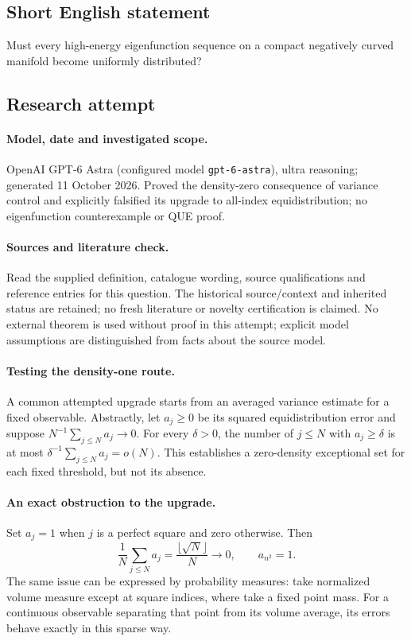 \documentclass[11pt]{article}
\begin{document}
\subsection{Short English statement}
Must every high-energy eigenfunction sequence on a compact negatively curved manifold become uniformly distributed?
\subsection{Research attempt}
\paragraph{Model, date and investigated scope.}
OpenAI GPT-6 Astra (configured model \texttt{gpt-6-astra}), ultra reasoning; generated 11 October 2026. Proved the density-zero consequence of variance control and explicitly falsified its upgrade to all-index equidistribution; no eigenfunction counterexample or QUE proof.

\paragraph{Sources and literature check.}
Read the supplied definition, catalogue wording, source qualifications and reference entries for this question. The historical source/context and inherited status are retained; no fresh literature or novelty certification is claimed. No external theorem is used without proof in this attempt; explicit model assumptions are distinguished from facts about the source model.

\paragraph{Testing the density-one route.} A common attempted upgrade starts from an averaged variance estimate for a fixed observable. Abstractly, let \(a_j\ge0\) be its squared equidistribution error and suppose \(N^{-1}\sum_{j\le N}a_j\to0\). For every \(\delta>0\), the number of \(j\le N\) with \(a_j\ge\delta\) is at most \(\delta^{-1}\sum_{j\le N}a_j=o(N)\). This establishes a zero-density exceptional set for each fixed threshold, but not its absence.
\paragraph{An exact obstruction to the upgrade.} Set \(a_j=1\) when \(j\) is a perfect square and zero otherwise. Then
\[
 \frac1N\sum_{j\le N}a_j=\frac{\lfloor\sqrt N\rfloor}{N}\longrightarrow0,
 \qquad a_{n^2}=1.
\]
The same issue can be expressed by probability measures: take normalized volume measure except at square indices, where take a fixed point mass. For a continuous observable separating that point from its volume average, its errors behave exactly in this sparse way.
\end{document}
